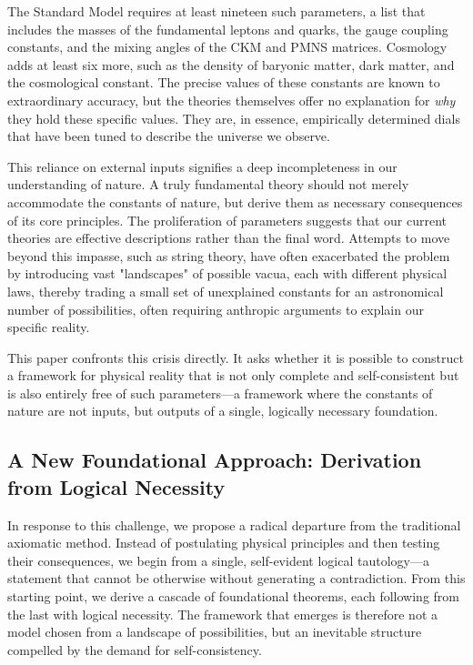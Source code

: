 \documentclass[11pt,a4paper]{article}
\begin{document}
The Standard Model requires at least nineteen such parameters, a list that includes the masses of the fundamental leptons and quarks, the gauge coupling constants, and the mixing angles of the CKM and PMNS matrices. Cosmology adds at least six more, such as the density of baryonic matter, dark matter, and the cosmological constant. The precise values of these constants are known to extraordinary accuracy, but the theories themselves offer no explanation for \textit{why} they hold these specific values. They are, in essence, empirically determined dials that have been tuned to describe the universe we observe.

This reliance on external inputs signifies a deep incompleteness in our understanding of nature. A truly fundamental theory should not merely accommodate the constants of nature, but derive them as necessary consequences of its core principles. The proliferation of parameters suggests that our current theories are effective descriptions rather than the final word. Attempts to move beyond this impasse, such as string theory, have often exacerbated the problem by introducing vast "landscapes" of possible vacua, each with different physical laws, thereby trading a small set of unexplained constants for an astronomical number of possibilities, often requiring anthropic arguments to explain our specific reality.

This paper confronts this crisis directly. It asks whether it is possible to construct a framework for physical reality that is not only complete and self-consistent but is also entirely free of such parameters—a framework where the constants of nature are not inputs, but outputs of a single, logically necessary foundation.

\subsection{A New Foundational Approach: Derivation from Logical Necessity}
In response to this challenge, we propose a radical departure from the traditional axiomatic method. Instead of postulating physical principles and then testing their consequences, we begin from a single, self-evident logical tautology—a statement that cannot be otherwise without generating a contradiction. From this starting point, we derive a cascade of foundational theorems, each following from the last with logical necessity. The framework that emerges is therefore not a model chosen from a landscape of possibilities, but an inevitable structure compelled by the demand for self-consistency.
\end{document}
